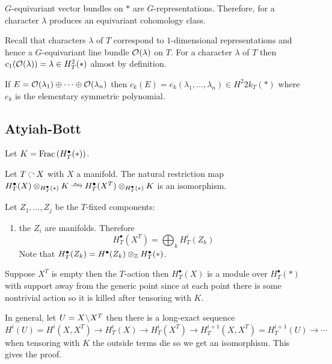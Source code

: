 \documentclass[12pt]{article}
\begin{document}
\begin{example}
$G$-equivariant vector bundles on $*$ are $G$-representations. Therefore, for a character $\lambda$ produces an equivariant cohomology class.
\end{example} 

\begin{example}
Recall that characters $\lambda$ of $T$ correspond to $1$-dimensional representations and hence a $G$-equivariant line bundle $\mathcal{O}_{}(\lambda)$ on $T$.
For a character $\lambda$ of $T$ then $c_1(\mathcal{O}_{}(\lambda)) = \lambda \in H^2_T(*)$ almost by definition. 
\end{example}

\begin{example}
If $E = \mathcal{O}_{}(\lambda_1) \oplus \cdots \oplus \mathcal{O}_{}(\lambda_n)$ then $c_k(E) = e_k(\lambda_1, \dots, \lambda_n) \in H^2{2k}_T(*)$ where $e_k$ is the elementary symmetric polynomial. 
\end{example}

\subsection{Atyiah-Bott}

Let $K = \mathrm{Frac}\left(H^\bullet_T(*)\right)$. 

\begin{theorem}
Let $T \acts X$ with $X$ a manifold.
The natural restriction map $H_T^\bullet(X) \ot_{H^\bullet_T(*)} K \iso H^\bullet_T(X^T) \ot_{H^\bullet_T(*)} K$ is an isomorphism.
\end{theorem}

Let $Z_1, \dots, Z_j$ be the $T$-fixed components:
\begin{enumerate}
\item the $Z_i$ are manifolds. Therefore
\[ H_T^\bullet(X^T) = \bigoplus_k H^i_T(Z_k) \]
Note that $H_T^\bullet(Z_k) = H^\bullet(Z_k) \otimes_{\mathbb{Z}} H^\bullet_T(*)$. 
\end{enumerate}

\begin{example}
Suppose $X^T$ is empty then the $T$-action then $H^\bullet_T(X)$ is a module over $H^\bullet_T(*)$ with support away from the generic point since at each point there is some nontrivial action so it is killed after tensoring with $K$. 
\end{example}

In general, let $U = X \! \setminus \! X^T$ then there is a long-exact sequence
\[ H^i(U) = H^i(X, X^T) \to H^i_T(X) \to H^i_T(X^T) \to H^{i+1}_T(X, X^T) = H^{i+1}_T(U) \to \cdots \]
when tensoring with $K$ the outside terms die so we get an isomorphism. This gives the proof.
\end{document}
